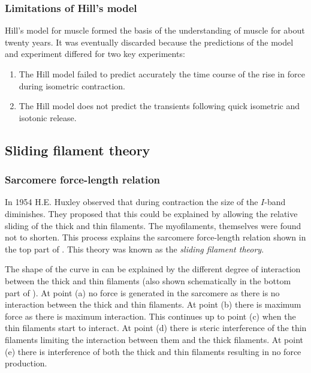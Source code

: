 \subsubsection{Limitations of Hill's model}

Hill's model for muscle formed the basis of the understanding of muscle for
about twenty years. It was eventually discarded because the predictions of the
model and experiment differed for two key experiments:
\begin{enumerate}
\item The Hill model failed to predict accurately the time course of the rise
  in force during isometric contraction.
\item The Hill model does not predict the transients following quick isometric
  and isotonic release.
\end{enumerate}

\subsection{Sliding filament theory}

\subsubsection{Sarcomere force-length relation}

In 1954 H.E. Huxley observed that during contraction the size of the $I$-band
diminishes.  They proposed that this could be explained by allowing the
relative sliding of the thick and thin filaments. The myofilaments, themselves
were found not to shorten. This process explains the sarcomere force-length
relation shown in the top part of . This theory
was known as the \emph{sliding filament theory}.


The shape of the curve in  can be explained by
the different degree of interaction between the thick and thin filaments (also
shown schematically in the bottom part of ). At
point (a) no force is generated in the sarcomere as there is no interaction
between the thick and thin filaments. At point (b) there is maximum force as
there is maximum interaction. This continues up to point (c) when the thin
filaments start to interact. At point (d) there is steric interference of
the thin filaments limiting the interaction between them and the thick
filaments. At point (e) there is interference of both the thick and thin
filaments resulting in no force production.

